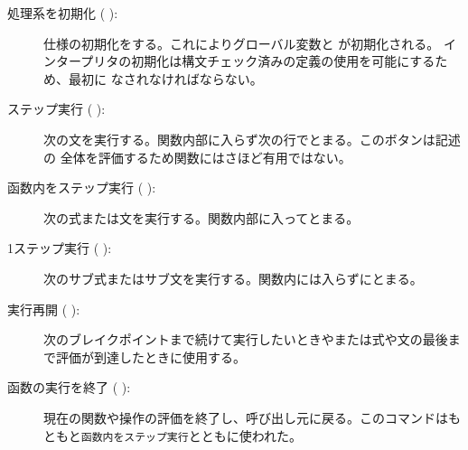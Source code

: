 \documentclass[\pformat,12pt]{jarticle}
\newcommand{\guicmd}[1]{{\gt #1}}
\begin{document}
\begin{description}

\item[\guicmd{処理系を初期化} (\hspace{-1.8mm}
):]
仕様の初期化をする。これによりグローバル変数と
 が初期化される。
インタープリタの初期化は構文チェック済みの定義の使用を可能にするため、最初に
なされなければならない。

\item[\guicmd{ステップ実行} (\hspace{-1.8mm}
):] 
  次の文を実行する。関数内部に入らず次の行でとまる。このボタンは記述の
  全体を評価するため関数にはさほど有用ではない。

\item[\guicmd{函数内をステップ実行} (\hspace{-1.8mm}
):] 
  次の式または文を実行する。関数内部に入ってとまる。
  
\item[\guicmd{1ステップ実行} (\hspace{-1.8mm}
):] 
  次のサブ式またはサブ文を実行する。関数内には入らずにとまる。

\item[\guicmd{実行再開} (\hspace{-1.8mm}
):] 
  次のブレイクポイントまで続けて実行したいときやまたは式や文の最後まで評価が到達したときに使用する。
  
\item[\guicmd{函数の実行を終了} (\hspace{-1.8mm}
):] 
  現在の関数や操作の評価を終了し、呼び出し元に戻る。このコマンドはもともと{\tt 函数内をステップ実行}とともに使われた。
  

\end{description}
\end{document}
